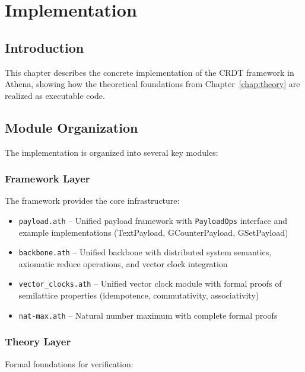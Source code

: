 
\chapter{Implementation}\label{chap:implementation}

\section{Introduction}

This chapter describes the concrete implementation of the CRDT framework in Athena, showing how the theoretical foundations from Chapter~\ref{chap:theory} are realized as executable code.

\section{Module Organization}

The implementation is organized into several key modules:

\subsection{Framework Layer}

The framework provides the core infrastructure:

\begin{itemize}
  \item \texttt{payload.ath} -- Unified payload framework with \texttt{PayloadOps} interface and example implementations (TextPayload, GCounterPayload, GSetPayload)
  \item \texttt{backbone.ath} -- Unified backbone with distributed system semantics, axiomatic reduce operations, and vector clock integration
  \item \texttt{vector\_clocks.ath} -- Unified vector clock module with formal proofs of semilattice properties (idempotence, commutativity, associativity)
  \item \texttt{nat-max.ath} -- Natural number maximum with complete formal proofs
\end{itemize}

\subsection{Theory Layer}

Formal foundations for verification:

